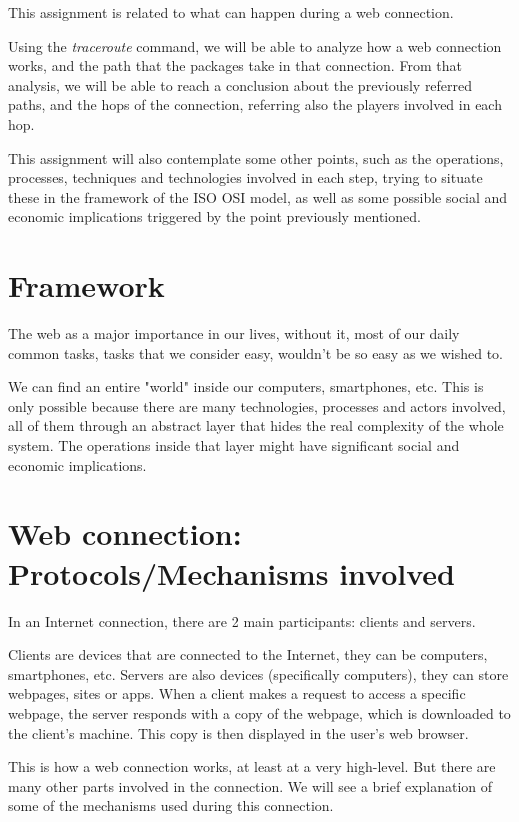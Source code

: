 \documentclass{article}
\newcommand\tab[1][1cm]{\hspace*{#1}}
\begin{document}
\tab This assignment is related to what can happen during a web connection.

Using the \textit{traceroute} command, we will be able to analyze how a web connection works, and the path that the packages take in that connection.
From that analysis, we will be able to reach a conclusion about the previously referred paths, and the hops of the connection, referring also the players involved in each hop.

This assignment will also contemplate some other points, such as the operations, processes, techniques and technologies involved in each step, trying to situate these in the framework of the ISO OSI model, as well as some possible social and economic implications triggered by the point previously mentioned.

\section{Framework}

The web as a major importance in our lives, without it, most of our daily common tasks, tasks that we consider easy, wouldn't be so easy as we wished to. 

We can find an entire "world" inside our computers, smartphones, etc. This is only possible because there are many technologies, processes and actors involved, all of them through an abstract layer that hides the real complexity of the whole system. The operations inside that layer might have significant social and economic implications.

\section{Web connection: Protocols/Mechanisms involved}

\tab In an Internet connection, there are 2 main participants: clients and servers.

Clients are devices that are connected to the Internet, they can be computers, smartphones, etc. Servers are also devices (specifically computers), they can store webpages, sites or apps. 
When a client makes a request to access a specific webpage, the server responds with a copy of the webpage, which is downloaded to the client's machine. This copy is then displayed in the user's web browser.

This is how a web connection works, at least at a very high-level. But there are many other parts involved in the connection. We will see a brief explanation of some of the mechanisms used during this connection.
\end{document}
